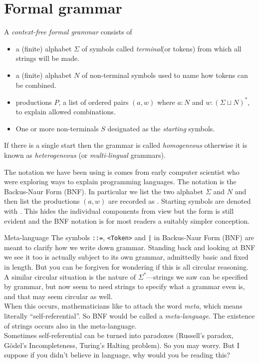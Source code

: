 

\section{Formal grammar}
A \emph{context-free formal grammar} consists of 
\begin{itemize}
    \item {} a (finite) alphabet $\Sigma$ 
    of symbols called \emph{terminal}(or tokens) from which all strings will be made.
    \item {} a (finite) alphabet $N$ of non-terminal symbols
    used to name how tokens can be combined.
    \item {} productions $P$, a list of ordered pairs 
    $(a,w)$ where $a:N$ and $w:(\Sigma\sqcup N)^*$, to explain allowed 
    combinations.
    \item One or more non-terminals $S$ designated as the \emph{starting}
    symbols.
\end{itemize}
If there is a single start then the grammar is called \emph{homogeneous}
otherwise it is known as \emph{heterogeneous} (or \emph{multi-lingual} grammars).

The notation we have been using is comes from early computer
scientist who were exploring ways to explain programming languages. The notation
 is the Backus-Naur Form (BNF). In
particular we list the two alphabet $\Sigma$ and $N$ and then list the
productions $(a,w)$ are recorded as .  Starting symbols are
denoted with .  This hides the individual components from 
view but the form is still evident and the BNF notation is for most readers 
a suitably simpler conception.



\begin{remark}{Meta-language}
    The symbols \lstinline{::=}, \lstinline{<Token>} and \lstinline{|} in
    Backus-Naur Form (BNF) are meant to clarify how we write down grammar.
    Standing back and looking at BNF we see  it too is actually subject to its
    own grammar, admittedly basic and fixed in length.  But you can be forgiven
    for wondering if this is all circular reasoning.  A similar circular 
    situation is the nature of $\Sigma^*$---strings we saw can be specified by 
    grammar, but now seem to need strings to specify what a grammar even is, 
    and that may seem circular as well.\\
    
    
    When this occurs,
    mathematicians like to attach the word \emph{meta}, which means literally
    ``self-referential''. So BNF would be called a \emph{meta-language}.
    The existence of strings occurs also in the meta-language.\\

    Sometimes self-referential can be turned into paradoxes (Russell's paradox,
    G\"odel's Incompleteness, Turing's Halting problem).  So you may worry.  But
    I suppose if you didn't believe in language, why would you be reading this?
\end{remark}


